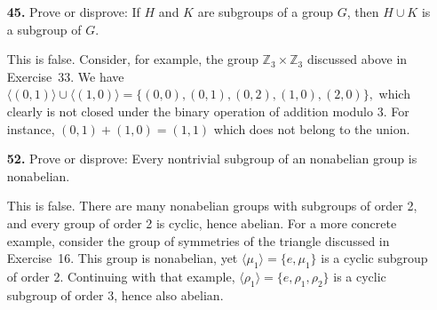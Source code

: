 \documentclass[12pt,reqno]{amsart}
\newcommand{\<}{\ensuremath{\langle}}
\renewcommand{\>}{\ensuremath{\rangle}}
\newcommand{\Z}{\ensuremath{\mathbb{Z}}}
\begin{document}
\begin{enumerate}
\medskip

\item[{\bf 45.}]
Prove or disprove:  If $H$ and $K$ are subgroups of a group $G$, then
$H \cup K$ is a subgroup of $G$. 

\medskip
{} This is false.  Consider, for example, the group 
$\Z_3 \times \Z_3$ discussed above in Exercise~33.  We have 
$\<(0,1)\> \cup \<(1,0)\> = \{(0,0), (0,1), (0,2), (1,0), (2,0)\},$
which clearly is not closed under the binary operation of 
addition modulo 3.  For instance, $(0,1) + (1,0) = (1,1)$ which does not belong
to the union. 
\medskip

\item[{\bf 52.}]
Prove or disprove: Every nontrivial subgroup of an nonabelian group is
nonabelian.

\medskip
{} This is false.  There are many nonabelian groups with
subgroups of order 2, and every group of order 2 is cyclic, hence abelian.  For
a more concrete example, consider the group of symmetries of the triangle
discussed in Exercise~16.  This group is nonabelian, yet 
$\<\mu_1\> = \{e, \mu_1\}$ is a cyclic subgroup of order 2.
Continuing with that example, $\<\rho_1\> = \{e, \rho_1, \rho_2\}$ is a cyclic
subgroup of order 3, hence also abelian.

\medskip
\end{enumerate}
\end{document}

